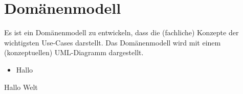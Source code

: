 \section{Domänenmodell}
Es ist ein Domänenmodell zu entwickeln, dass die (fachliche) Konzepte der wichtigsten Use-Cases darstellt. Das Domänenmodell wird mit einem (konzeptuellen) UML-Diagramm dargestellt. 

\begin{itemize}
\item Hallo
\itme
\end{itemize}

Hallo Welt